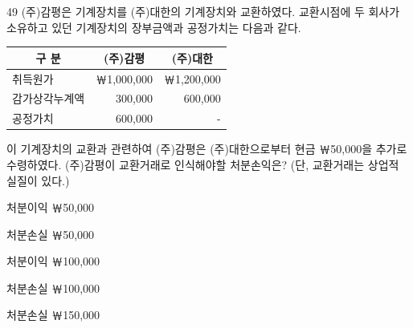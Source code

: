 \begin{question}{49}
(주)감평은 기계장치를 (주)대한의 기계장치와 교환하였다. 교환시점에 두 회사가 소유하고 있던 기계장치의 장부금액과 공정가치는 다음과 같다.

{\small\centering
\begin{tabular}{|c|r|r|}\hline
구 분 & \multicolumn{1}{c|}{(주)감평} & \multicolumn{1}{c|}{(주)대한} \\ \hline
\multicolumn{1}{|l|}{취득원가} & ￦1,000,000 & ￦1,200,000 \\ \hline
\multicolumn{1}{|l|}{감가상각누계액} & 300,000 & 600,000 \\ \hline
\multicolumn{1}{|l|}{공정가치} & 600,000 & - \\ \hline
\end{tabular}\par}

이 기계장치의 교환과 관련하여 (주)감평은 (주)대한으로부터 현금 ￦50,000을 추가로 수령하였다. (주)감평이 교환거래로 인식해야할 처분손익은? (단, 교환거래는 상업적 실질이 있다.)
\begin{choices}
  \item 처분이익 ￦50,000
  \item 처분손실 ￦50,000
  \item 처분이익 ￦100,000
  \item 처분손실 ￦100,000
  \item 처분손실 ￦150,000
\end{choices}
\end{question}
